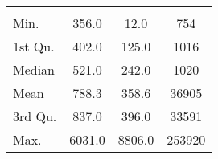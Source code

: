 \begin{tabular}{lS[table-format=5.1]S[table-format=5.1]S[table-format=5.1]}
&  &  &  \\
 Min.    & 356.0 & 12.0 & 754 \\
 1st Qu. & 402.0 & 125.0 & 1016 \\
 Median  & 521.0 & 242.0 & 1020 \\
 Mean    & 788.3 & 358.6 & 36905 \\
 3rd Qu. & 837.0 & 396.0 & 33591 \\
 Max.    & 6031.0 & 8806.0 & 253920 \\
\end{tabular}

